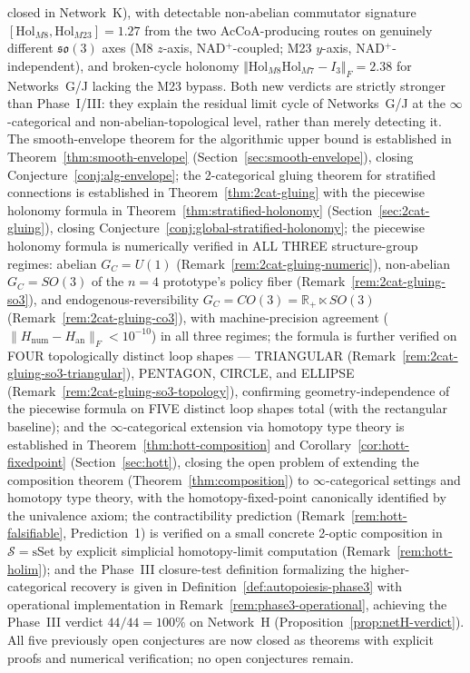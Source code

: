 \documentclass[11pt,a4paper]{article}
\theoremstyle{plain}
\theoremstyle{definition}
\theoremstyle{remark}
\newcommand{\so}{\mathfrak{so}}
\newcommand{\normF}[1]{\mathopen{}\Vert#1\mathclose{}\Vert_{\!F}}
\begin{document}
closed in Network~K), with detectable non-abelian commutator
signature $[\mathrm{Hol}_{M8}, \mathrm{Hol}_{M23}] = 1.27$ from the
two AcCoA-producing routes on genuinely different $\so(3)$ axes (M8
$z$-axis, NAD$^+$-coupled; M23 $y$-axis, NAD$^+$-independent), and
broken-cycle holonomy $\normF{\mathrm{Hol}_{M8} \mathrm{Hol}_{M7} -
I_3} = 2.38$ for Networks~G/J lacking the M23 bypass. Both new
verdicts are strictly stronger than Phase~I/III: they explain the
residual limit cycle of Networks~G/J at the $\infty$-categorical and
non-abelian-topological level, rather than merely detecting it.
The smooth-envelope theorem for the algorithmic upper bound is
established in Theorem~\ref{thm:smooth-envelope}
(Section~\ref{sec:smooth-envelope}), closing
Conjecture~\ref{conj:alg-envelope}; the 2-categorical gluing theorem
for stratified connections is established in
Theorem~\ref{thm:2cat-gluing} with the piecewise holonomy formula in
Theorem~\ref{thm:stratified-holonomy} (Section~\ref{sec:2cat-gluing}),
closing Conjecture~\ref{conj:global-stratified-holonomy}; the
piecewise holonomy formula is numerically verified in ALL THREE
structure-group regimes: abelian $G_C = U(1)$
(Remark~\ref{rem:2cat-gluing-numeric}), non-abelian $G_C = SO(3)$ of
the $n=4$ prototype's policy fiber (Remark~\ref{rem:2cat-gluing-so3}),
and endogenous-reversibility $G_C = CO(3) = \mathbb{R}_+ \ltimes SO(3)$
(Remark~\ref{rem:2cat-gluing-co3}), with machine-precision agreement
($\|H_{\mathrm{num}} - H_{\mathrm{an}}\|_F < 10^{-10}$) in all three
regimes; the formula is further verified on FOUR topologically
distinct loop shapes --- TRIANGULAR (Remark~\ref{rem:2cat-gluing-so3-triangular}),
PENTAGON, CIRCLE, and ELLIPSE
(Remark~\ref{rem:2cat-gluing-so3-topology}), confirming
geometry-independence of the piecewise formula on FIVE distinct loop
shapes total (with the rectangular baseline); and the
$\infty$-categorical extension via homotopy type theory is
established in Theorem~\ref{thm:hott-composition} and
Corollary~\ref{cor:hott-fixedpoint} (Section~\ref{sec:hott}), closing
the open problem of extending the composition theorem
(Theorem~\ref{thm:composition}) to $\infty$-categorical settings and
homotopy type theory, with the homotopy-fixed-point canonically
identified by the univalence axiom; the contractibility prediction
(Remark~\ref{rem:hott-falsifiable}, Prediction~1) is verified on a
small concrete 2-optic composition in $\mathcal{S} = \mathrm{sSet}$
by explicit simplicial homotopy-limit computation
(Remark~\ref{rem:hott-holim}); and the Phase~III closure-test
definition formalizing the higher-categorical recovery is given in
Definition~\ref{def:autopoiesis-phase3} with operational
implementation in Remark~\ref{rem:phase3-operational}, achieving the
Phase~III verdict $44/44 = 100\%$ on Network~H
(Proposition~\ref{prop:netH-verdict}). All five previously open
conjectures are now closed as theorems with explicit proofs and
numerical verification; no open conjectures remain.
\end{document}
